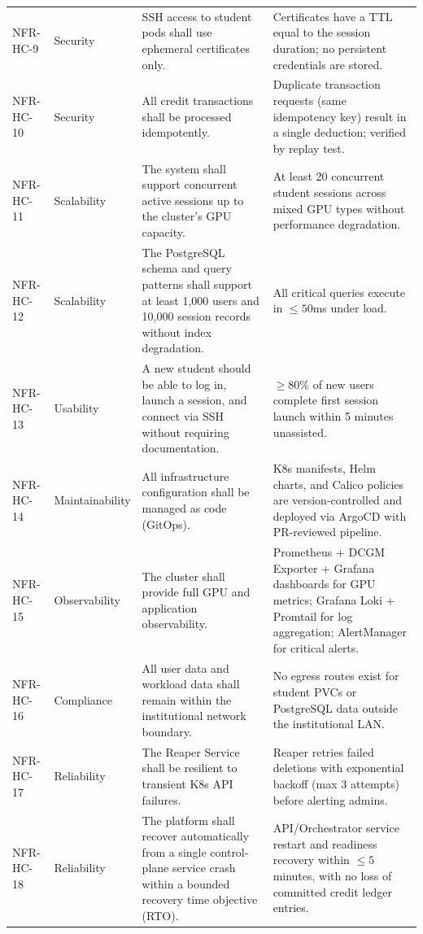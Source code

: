 \documentclass[12pt,a4paper]{article}
\begin{document}
\begin{longtable}{@{}L{2.4cm}L{2.5cm}L{5.3cm}L{4.5cm}@{}}
  NFR-HC-9 & Security & SSH access to student pods shall use ephemeral certificates only. & Certificates have a TTL equal to the session duration; no persistent credentials are stored. \\
    NFR-HC-10 & Security & All credit transactions shall be processed idempotently. & Duplicate transaction requests (same idempotency key) result in a single deduction; verified by replay test. \\
  NFR-HC-11 & Scalability & The system shall support concurrent active sessions up to the cluster's GPU capacity. & At least 20 concurrent student sessions across mixed GPU types without performance degradation. \\
    NFR-HC-12 & Scalability & The PostgreSQL schema and query patterns shall support at least 1,000 users and 10,000 session records without index degradation. & All critical queries execute in $\leq 50$ms under load. \\
  NFR-HC-13 & Usability & A new student should be able to log in, launch a session, and connect via SSH without requiring documentation. & $\geq 80\%$ of new users complete first session launch within 5 minutes unassisted. \\
    NFR-HC-14 & Maintainability & All infrastructure configuration shall be managed as code (GitOps). & K8s manifests, Helm charts, and Calico policies are version-controlled and deployed via ArgoCD with PR-reviewed pipeline. \\
  NFR-HC-15 & Observability & The cluster shall provide full GPU and application observability. & Prometheus + DCGM Exporter + Grafana dashboards for GPU metrics; Grafana Loki + Promtail for log aggregation; AlertManager for critical alerts. \\
    NFR-HC-16 & Compliance & All user data and workload data shall remain within the institutional network boundary. & No egress routes exist for student PVCs or PostgreSQL data outside the institutional LAN. \\
  NFR-HC-17 & Reliability & The Reaper Service shall be resilient to transient K8s API failures. & Reaper retries failed deletions with exponential backoff (max 3 attempts) before alerting admins. \\
    NFR-HC-18 & Reliability & The platform shall recover automatically from a single control-plane service crash within a bounded recovery time objective (RTO). & API/Orchestrator service restart and readiness recovery within $\leq 5$ minutes, with no loss of committed credit ledger entries. \\
\end{longtable}
\end{document}
